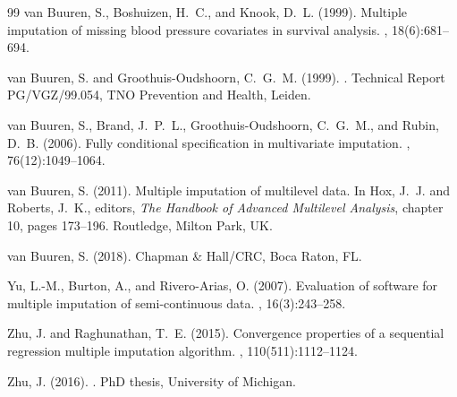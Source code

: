 \documentclass[
]{book}
\begin{document}
\begin{thebibliography}{99}
{van Buuren}, S., Boshuizen, H.~C., and Knook, D.~L. (1999).
\newblock Multiple imputation of missing blood pressure covariates in survival analysis.
, 18(6):681--694.

{van Buuren}, S. and Groothuis-Oudshoorn, C.~G.~M. (1999).
.
\newblock Technical Report PG/VGZ/99.054, TNO Prevention and Health, Leiden.

{van Buuren}, S., Brand, J.~P.~L., Groothuis-Oudshoorn, C.~G.~M., and Rubin, D.~B. (2006).
\newblock Fully conditional specification in multivariate imputation.
, 76(12):1049--1064.

{van Buuren}, S. (2011).
\newblock Multiple imputation of multilevel data.
\newblock In Hox, J.~J. and Roberts, J.~K., editors, {\em The Handbook of Advanced Multilevel Analysis}, chapter 10, pages 173--196. Routledge, Milton Park, UK.

{van Buuren}, S. (2018).
\newblock Chapman \& Hall/CRC, Boca Raton, FL.

Yu, L.-M., Burton, A., and Rivero-Arias, O. (2007).
\newblock Evaluation of software for multiple imputation of semi-continuous data.
, 16(3):243--258.

Zhu, J. and Raghunathan, T.~E. (2015).
\newblock Convergence properties of a sequential regression multiple imputation algorithm.
, 110(511):1112--1124.

Zhu, J. (2016).
.
\newblock PhD thesis, University of Michigan.

\end{thebibliography}
\end{document}
